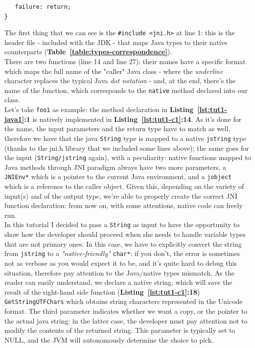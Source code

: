 \documentclass[a4paper,10pt]{article}
\newcommand{\keyword}[1]{\texttt{#1}}
\newcommand{\reft}[1]{\textbf{Table~\ref{#1}}}
\newcommand{\refl}[1]{\textbf{Listing~\ref{#1}}}
\begin{document}
\begin{multicols}{2}
\begin{lstlisting}
   failure: return;
}
\end{lstlisting}
The first thing that we can see is the \keyword{\#include <jni.h>} at line 1: this is the header file - included with the JDK - that maps Java types to their native counterparts (\reft{table:types-correspondence}).\\
There are two functions (line 14 and line 27): their names have a specific format which maps the full name of the "caller" Java class - where the \textit{underline} character replaces the typical Java \textit{dot notation} - and, at the end, there's the name of the function, which corresponds to the \keyword{native} method declared into our class.\\
Let's take \keyword{foo1} as example: the method declaration in \refl{lst:tut1-java1}\textbf{:1} is natively implemented in \refl{lst:tut1-c1}\textbf{:14}. As it's done for the name, the input parameters and the return type have to match as well, therefore we have that the java \keyword{String} type is mapped to a native \keyword{jstring} type (thanks to the jni.h library that we included some lines above); the same goes for the input (\keyword{String/jstring} again), with a peculiarity: native functions mapped to Java methods through JNI paradigm always have two more parameters, a \keyword{JNIEnv*} which is a pointer to the current Java environment, and a \keyword{jobject} which is a reference to the caller object. Given this, depending on the variety of input(s) and of the output type, we're able to properly create the correct JNI function declaration: from now on, with some attentions, native code can freely run.\\
In this tutorial I decided to pass a \keyword{String} as input to have the opportunity to show how the developer should proceed when she needs to handle variable types that are not primary ones. In this case, we have to explicitly convert the string from \keyword{jstring} to a \textit{"native-friendly"} \keyword{char*}: if you don't, the error is sometimes not as verbose as you would expect it to be, and it's quite hard to debug this situation, therefore pay attention to the Java/native types mismatch. As the reader can easily understand, we declare a native string, which will save the result of the right-hand side function (\refl{lst:tut1-c1}\textbf{:18}) \keyword{GetStringUTFChars} which obtains string characters represented in the Unicode format. The third parameter indicates whether we want a copy, or the pointer to the actual java string: in the latter case, the developer must pay attention not to modify the contents of the returned string. This parameter is typically set to NULL, and the JVM will autonomously determine the choice to pick.\\

\end{multicols}
\end{document}
